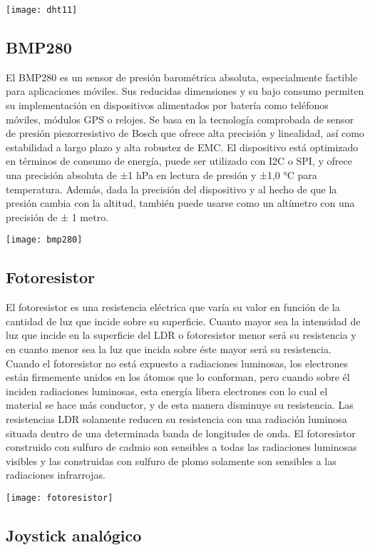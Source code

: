 \texttt{[image: dht11]}


\subsection{BMP280}

El BMP280 es un sensor de presión barométrica absoluta, especialmente factible para aplicaciones móviles. Sus reducidas dimensiones y su bajo consumo permiten su implementación en dispositivos alimentados por batería como teléfonos móviles, módulos GPS o relojes. Se basa en la tecnología comprobada de sensor de presión piezorresistivo de Bosch que ofrece alta precisión y linealidad, así como estabilidad a largo plazo y alta robustez de EMC. El dispositivo está optimizado en términos de consumo de energía, puede ser utilizado con I2C o SPI, y ofrece una precisión absoluta de ±1 hPa en lectura de presión y ±1,0 °C para temperatura. Además, dada la precisión del dispositivo y al hecho de que la presión cambia con la altitud, también puede usarse como un altímetro con una precisión de ± 1 metro.


\texttt{[image: bmp280]}

\subsection{Fotoresistor}



El fotoresistor es una resistencia eléctrica que varía su valor en función de la cantidad de luz que incide sobre su superficie. Cuanto mayor sea la intensidad de luz que incide en la superficie del LDR o fotoresistor menor será su resistencia y en cuanto menor sea la luz que incida sobre éste mayor será su resistencia. 
Cuando el fotoresistor no está expuesto a radiaciones luminosas, los electrones están firmemente unidos en los átomos que lo conforman, pero cuando sobre él inciden radiaciones luminosas, esta energía libera electrones con lo cual el material se hace más conductor, y de esta manera disminuye su resistencia. Las resistencias LDR solamente reducen su resistencia con una radiación luminosa situada dentro de una determinada banda de longitudes de onda. El fotoresistor construido con sulfuro de cadmio son sensibles a todas las radiaciones luminosas visibles y las construidas con sulfuro de plomo solamente son sensibles a las radiaciones infrarrojas.


\texttt{[image: fotoresistor]}


\subsection{Joystick analógico}

